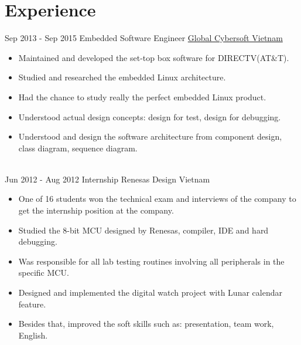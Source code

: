 \documentclass[letterpaper]{twentysecondcv} %
\begin{document}
\section{Experience}
\begin{twenty}
	\twentyitem
	{Sep 2013 -}
	{Sep 2015}
	{Embedded Software Engineer}
	{\href{http://www.globalcybersoft.com/en}{Global Cybersoft Vietnam}}
	{}
	{
		{\begin{itemize}
				\item Maintained and developed the set-top box software for DIRECTV(AT\&T).
				\item Studied and researched the embedded Linux architecture.
				\item Had the chance to study really the perfect embedded Linux product.
				\item Understood actual design concepts: design for test, design for debugging.
				\item Understood and design the software architecture from component design, class diagram, sequence diagram.
		\end{itemize}}
	}
	\\
	\twentyitem
	{Jun 2012 -}
	{Aug 2012}
	{Internship}
	{{Renesas Design Vietnam}}
	{}
	{
		\begin{itemize}
			\item One of 16 students won the technical exam and interviews of the company to get the internship position at the company.
			\item Studied the 8-bit MCU designed by Renesas, compiler, IDE and hard debugging.
			\item Was responsible for all lab testing routines involving all peripherals in the specific MCU.
			\item Designed and implemented the digital watch project with Lunar calendar feature.
			\item Besides that, improved the soft skills such as: presentation, team work, English.
		\end{itemize}
	}
	    \\   

\end{twenty}
\end{document}
